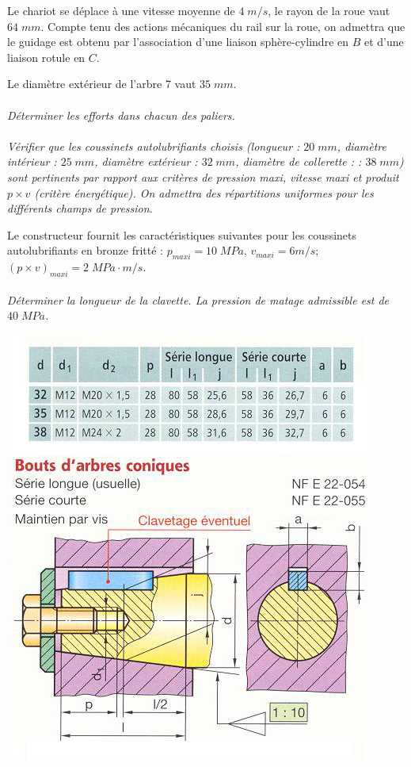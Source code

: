 \documentclass[11pt,oneside]{article}
\begin{document}
Le chariot se déplace à une vitesse moyenne de $4\; m/s$, le rayon de la roue vaut $64\; mm$. Compte tenu des actions mécaniques du rail sur la roue, on admettra que le guidage est obtenu par l'association d'une liaison sphère-cylindre en $B$ et d'une liaison rotule en $C$.
%
%

Le diamètre extérieur de l'arbre 7 vaut $35\; mm$. 


\paragraph*{}
\textit{Déterminer les efforts dans chacun des paliers.}

\paragraph*{}
\textit{Vérifier que les coussinets autolubrifiants choisis (longueur : $20\; mm$, diamètre intérieur : $25\; mm$, diamètre extérieur : $32\; mm$, diamètre de collerette :  : $38\; mm$) sont pertinents par rapport aux critères de pression maxi, vitesse maxi et produit $p\times v$ (critère énergétique). On admettra des répartitions uniformes pour les différents champs de pression.}

Le constructeur fournit les caractéristiques suivantes pour les coussinets autolubrifiants en bronze fritté : 
$p_{maxi} = 10\; MPa$, $v_{maxi} = 6m/s$; $\left(p\times v \right)_{maxi}=2\;MPa \cdot m/s$.


\paragraph*{}
\textit{Déterminer la longueur de la clavette. La pression de matage admissible est de $40\; MPa$.}
\begin{center}
\includegraphics[width=.6\textwidth]{png/fig5}
\end{center}
\end{document}
